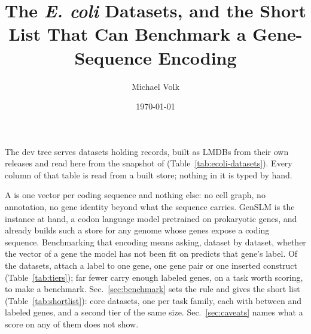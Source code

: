 \documentclass[10pt,a4paper]{article}
\title{\vspace{-1.5em}The \emph{E. coli} Datasets, and the Short List That Can
Benchmark a Gene-Sequence Encoding}
\author{Michael Volk}
\date{\today}
\begin{document}
\maketitle
\thispagestyle{empty}

\noindent
The dev tree serves \ecoliDatasetCount{}  datasets holding
\ecoliInstanceTotal{} records, built as LMDBs from their own releases and read here from
the snapshot of \snapshotDate{} (Table~\ref{tab:ecoli-datasets}). Every column of that
table is read from a built store; nothing in it is typed by hand.

A  is one vector per coding sequence and nothing else: no
cell graph, no annotation, no gene identity beyond what the sequence carries. GenSLM is
the instance at hand, a codon language model pretrained on prokaryotic genes, and
 already builds such a store for any genome whose
genes expose a coding sequence. Benchmarking that encoding means asking, dataset by
dataset, whether the vector of a gene the model has not been fit on predicts that gene's
label. Of the \ecoliDatasetCount{} datasets, \ecoliBestCount{} attach a label to one gene,
one gene pair or one inserted construct (Table~\ref{tab:tiers}); far fewer carry enough
labeled genes, on a task worth scoring, to make a benchmark. Sec.~\ref{sec:benchmark}
sets the rule and gives the short list (Table~\ref{tab:shortlist}): \coreCount{} core
datasets, one per task family, each with between \coreGenesMin{} and \coreGenesMax{}
labeled genes, and a second tier of the same size. Sec.~\ref{sec:caveats} names what a
score on any of them does not show.

\vspace{0.5em}
\tccontents
\clearpage




\end{document}
